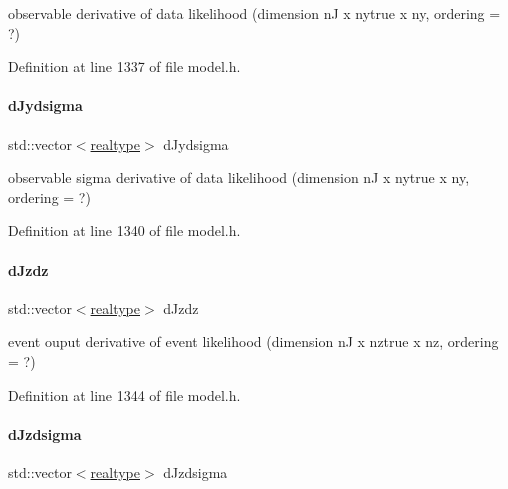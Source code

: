 observable derivative of data likelihood (dimension nJ x nytrue x ny, ordering = ?) 

Definition at line 1337 of file model.\+h.

\mbox{\label{classamici_1_1_model_a32c9ff2e3e5e1fa69bd54ca0ceb41876}} 
\paragraph{\texorpdfstring{dJydsigma}{dJydsigma}}
{\footnotesize\ttfamily std\+::vector$<$\mbox{\hyperlink{namespaceamici_a1bdce28051d6a53868f7ccbf5f2c14a3}{realtype}}$>$ d\+Jydsigma\hspace{0.3cm}{\ttfamily [protected]}}

observable sigma derivative of data likelihood (dimension nJ x nytrue x ny, ordering = ?) 

Definition at line 1340 of file model.\+h.

\mbox{\label{classamici_1_1_model_a6f9b92825da48e6a4b879a31670626f9}} 
\paragraph{\texorpdfstring{dJzdz}{dJzdz}}
{\footnotesize\ttfamily std\+::vector$<$\mbox{\hyperlink{namespaceamici_a1bdce28051d6a53868f7ccbf5f2c14a3}{realtype}}$>$ d\+Jzdz\hspace{0.3cm}{\ttfamily [protected]}}

event ouput derivative of event likelihood (dimension nJ x nztrue x nz, ordering = ?) 

Definition at line 1344 of file model.\+h.

\mbox{\label{classamici_1_1_model_adb1036c3ad16c2b4c48b71452eab63c7}} 
\paragraph{\texorpdfstring{dJzdsigma}{dJzdsigma}}
{\footnotesize\ttfamily std\+::vector$<$\mbox{\hyperlink{namespaceamici_a1bdce28051d6a53868f7ccbf5f2c14a3}{realtype}}$>$ d\+Jzdsigma\hspace{0.3cm}{\ttfamily [protected]}}

